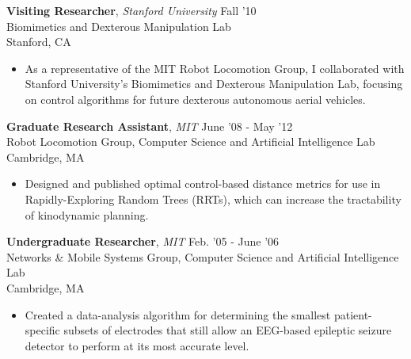 \documentclass[margin]{res}
\begin{document}
\begin{resume}
 {\bf Visiting Researcher}, {\it Stanford University} \hfill Fall '10 \\Biomimetics and Dexterous Manipulation Lab  \\ Stanford, CA 
 \begin{itemize} \itemsep -2pt  %
\item As a representative of the MIT Robot Locomotion Group, I collaborated with Stanford University's Biomimetics and Dexterous Manipulation Lab, focusing on control algorithms for future dexterous autonomous aerial vehicles.
 \end{itemize}

 {\bf Graduate Research Assistant}, {\it MIT} \hfill June '08 - May '12 \\ Robot Locomotion Group, Computer Science and Artificial Intelligence Lab \\ Cambridge, MA 
 \begin{itemize} \itemsep -2pt  %
 \item Designed and published optimal control-based distance metrics for use in Rapidly-Exploring Random Trees (RRTs), which can increase the tractability of kinodynamic planning.
 \end{itemize}
 
% 
  {\bf Undergraduate Researcher}, {\it MIT} \hfill Feb. '05 - June '06 \\ Networks \& Mobile Systems Group, Computer Science and Artificial Intelligence Lab \\ Cambridge, MA 
 \begin{itemize} \itemsep -2pt  %
\item Created a data-analysis algorithm for determining the smallest patient-specific subsets of electrodes that still allow an EEG-based epileptic seizure detector to perform at its most accurate level. 
\end{itemize}
 

\end{resume}
\end{document}
